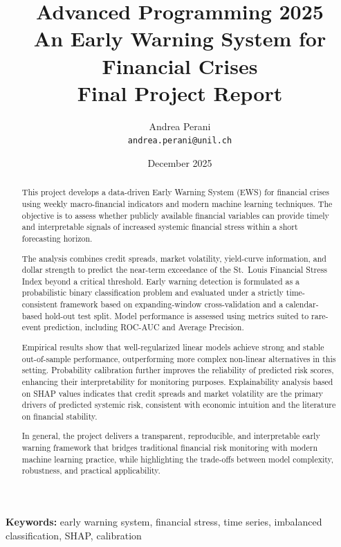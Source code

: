 \documentclass[11pt,a4paper]{article}
\title{%
    \Large \textbf{Advanced Programming 2025} \\
    \vspace{0.4cm}
    \LARGE \textbf{An Early Warning System for Financial Crises} \\
    \vspace{0.2cm}
    \large Final Project Report
}
\author{
    Andrea Perani \\
    \texttt{andrea.perani@unil.ch}
}
\date{December 2025}
\begin{document}
\maketitle
\thispagestyle{empty}

\begin{abstract}
\noindent
This project develops a data-driven Early Warning System (EWS) for financial crises using weekly macro-financial indicators and modern machine learning techniques. The objective is to assess whether publicly available financial variables can provide timely and interpretable signals of increased systemic financial stress within a short forecasting horizon.

The analysis combines credit spreads, market volatility, yield-curve information, and dollar strength to predict the near-term exceedance of the St.\ Louis Financial Stress Index beyond a critical threshold. Early warning detection is formulated as a probabilistic binary classification problem and evaluated under a strictly time-consistent framework based on expanding-window cross-validation and a calendar-based hold-out test split. Model performance is assessed using metrics suited to rare-event prediction, including ROC-AUC and Average Precision.

Empirical results show that well-regularized linear models achieve strong and stable out-of-sample performance, outperforming more complex non-linear alternatives in this setting. Probability calibration further improves the reliability of predicted risk scores, enhancing their interpretability for monitoring purposes. Explainability analysis based on SHAP values indicates that credit spreads and market volatility are the primary drivers of predicted systemic risk, consistent with economic intuition and the literature on financial stability.

In general, the project delivers a transparent, reproducible, and interpretable early warning framework that bridges traditional financial risk monitoring with modern machine learning practice, while highlighting the trade-offs between model complexity, robustness, and practical applicability.
\end{abstract}

\vspace{0.4cm}
\noindent\textbf{Keywords:} early warning system, financial stress, time series, imbalanced classification, SHAP, calibration
\end{document}
